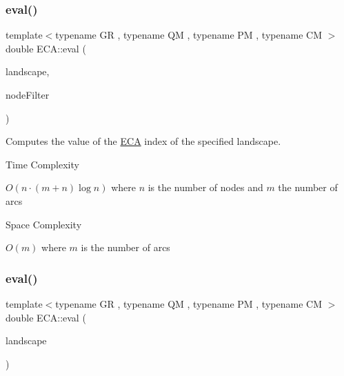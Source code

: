 \subsubsection{\texorpdfstring{eval()}{eval()}\hspace{0.1cm}{\footnotesize\ttfamily [1/2]}}
{\footnotesize\ttfamily template$<$typename GR , typename QM , typename PM , typename CM $>$ \\
double E\+C\+A\+::eval (\begin{DoxyParamCaption}\item[{const \hyperlink{classconcepts_1_1_abstract_landscape}{concepts\+::\+Abstract\+Landscape}$<$ GR, QM, PM, CM $>$ \&}]{landscape,  }\item[{const typename G\+R\+::template Node\+Map$<$ bool $>$ \&}]{node\+Filter }\end{DoxyParamCaption})\hspace{0.3cm}{\ttfamily [inline]}}



Computes the value of the \hyperlink{class_e_c_a}{E\+CA} index of the specified landscape. 

\begin{DoxyRefDesc}{Time Complexity}
\item[\hyperlink{time__time000005}{Time Complexity}]$O(n \cdot (m + n) \log n)$ where $n$ is the number of nodes and $m$ the number of arcs \end{DoxyRefDesc}
\begin{DoxyRefDesc}{Space Complexity}
\item[\hyperlink{space__space000005}{Space Complexity}]$O(m)$ where $m$ is the number of arcs \end{DoxyRefDesc}
\mbox{\label{class_e_c_a_ab6556319590259a816cf176e933746d7}} 
\subsubsection{\texorpdfstring{eval()}{eval()}\hspace{0.1cm}{\footnotesize\ttfamily [2/2]}}
{\footnotesize\ttfamily template$<$typename GR , typename QM , typename PM , typename CM $>$ \\
double E\+C\+A\+::eval (\begin{DoxyParamCaption}\item[{const \hyperlink{classconcepts_1_1_abstract_landscape}{concepts\+::\+Abstract\+Landscape}$<$ GR, QM, PM, CM $>$ \&}]{landscape }\end{DoxyParamCaption})\hspace{0.3cm}{\ttfamily [inline]}}



